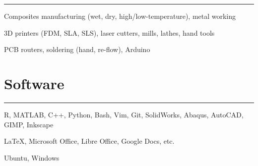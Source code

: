 \noindent\rule{\textwidth}{\hlinewidth}
    \begin{innerlist}
    \item Composites manufacturing (wet, dry, high/low-temperature), metal working
    \item 3D printers (FDM, SLA, SLS), laser cutters, mills, lathes, hand tools
    \item PCB routers, soldering (hand, re-flow), Arduino
    \end{innerlist}
\vfill
\section{Software}

\noindent\rule{\textwidth}{\hlinewidth}
    \begin{innerlist}
        \item R, MATLAB, C++, Python, Bash, Vim, Git, SolidWorks, Abaqus, AutoCAD, GIMP, Inkscape
        \item \LaTeX, Microsoft Office, Libre Office, Google Docs, etc.
	\item Ubuntu, Windows
    \end{innerlist}
\vfill
